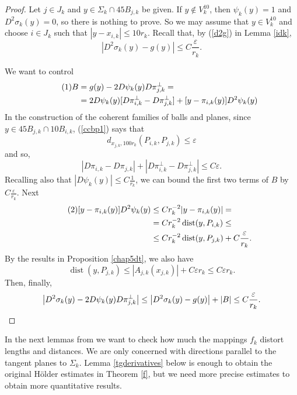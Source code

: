 \documentclass[11pt, twoside, leqno]{article}
\numberwithin{equation}{section}
\newcommand\numberthis{\addtocounter{equation}{1}\tag{\theequation}}
\theoremstyle{plain}
\theoremstyle{definition}
\newcommand{\e}{\varepsilon} %
\newcommand{\dist}{\operatorname{dist}}
\begin{document}
\begin{proof}
Let $j \in J_k$ and $y \in \Sigma_k \cap 45B_{j,k}$ be given. If $y \notin V_k^{10}$, then $\psi_k(y)=1$ and $D^2\sigma_k(y)=0$, so there is nothing to prove. So we may assume that $y \in V_k^{10}$ and choose $i \in J_k$ such that $|y-x_{i,k}| \leq 10r_k$. Recall that, by (\ref{d2g}) in Lemma \ref{idk},
\begin{equation}
\left|D^2\sigma_k(y) - g(y)\right|  \leq C\frac{\e}{r_k}.
\end{equation}

We want to control
\begin{align*} \numberthis
B & =g(y)- 2 D\psi_k(y)D\pi^{\perp}_{j,k} = \\
&= 2 D\psi_k(y)[D\pi^{\perp}_{i,k}-D\pi^{\perp}_{j,k}] + [y-\pi_{i,k}(y)]D^2\psi_k(y)
\end{align*}
In the construction of the coherent families of balls and planes, since $y \in 45B_{j,k} \cap 10B_{i,k}$, (\ref{ccbp1}) says that
\begin{equation}
d_{x_{j,k}, 100r_k}(P_{i,k}, P_{j,k})  \leq \e
\end{equation}
and so, 
\begin{equation}
\left|D\pi_{i,k}-D\pi_{j,k} \right| + \left| D\pi^{\perp}_{i,k}-D\pi^{\perp}_{j,k}\right| \leq C \e.
\end{equation}
Recalling also that $\left| D\psi_k(y)\right| \leq C\frac{1}{r_k}$, we can bound the first two terms of $B$ by  $C\frac{\e}{r_k}$. Next
\begin{align*} \numberthis
[y-\pi_{i,k}(y)]D^2\psi_k(y) & 
\leq C r_k^{-2} |y-\pi_{i,k}(y)| = \\
& = C r_k^{-2} \dist(y,P_{i,k}) \leq \\
& \leq C r_k^{-2} \dist(y,P_{j,k}) + C\frac{\e}{r_k}.
\end{align*}
By the results in Proposition \ref{chap5dt}, we also have
\begin{equation}
\dist(y,P_{j,k}) \leq |A_{j,k}(x_{j,k})| + C \e r_k \leq C\e r_k.
\end{equation}
Then, finally, 
\begin{equation}
\left|D^2\sigma_k(y) - 2 D\psi_k(y)D\pi^{\perp}_{j,k}\right| \leq \left|D^2\sigma_k(y) - g(y)\right| + |B| \leq C \frac{\e}{r_k}. \qedhere
\end{equation}
\end{proof}


In the next lemmas from \cite{davidtoro} we want to check how much the mappings $f_k$ distort lengths and distances. We are only concerned with directions parallel to the tangent planes to $\Sigma_k$. Lemma \ref{tgderivatives} below is enough to obtain the original H\"{o}lder estimates in Theorem \ref{f}, but we need more precise estimates to obtain more quantitative results.
\end{document}
